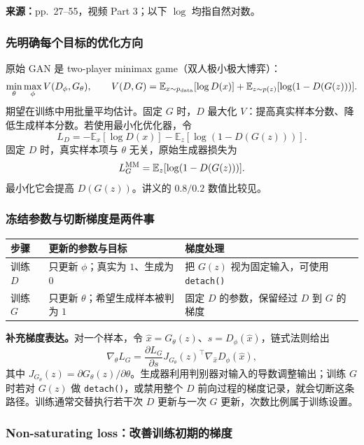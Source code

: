 \textbf{来源：}pp.~27--55，视频 Part 3；以下 $\log$ 均指自然对数。

\subsubsection{先明确每个目标的优化方向}

原始 GAN 是 two-player minimax game（双人极小极大博弈）：
\[
 \min_\theta\max_\phi V(D_\phi,G_\theta),\qquad
 V(D,G)=\mathbb E_{x\sim p_{\rm data}}[\log D(x)]
       +\mathbb E_{z\sim p(z)}[\log(1-D(G(z)))].
\]
期望在训练中用批量平均估计。固定 $G$ 时，$D$ 最大化 $V$：提高真实样本分数、降低生成样本分数。若使用最小化优化器，令
\[
 L_D=-\mathbb E_x[\log D(x)]-\mathbb E_z[\log(1-D(G(z)))].
\]
固定 $D$ 时，真实样本项与 $\theta$ 无关，原始生成器损失为
\[
 L_G^{\rm MM}=\mathbb E_z[\log(1-D(G(z)))].
\]
最小化它会提高 $D(G(z))$。讲义的 $0.8/0.2$ 数值比较见。

\subsubsection{冻结参数与切断梯度是两件事}

\begin{center}
\small
\begin{tabularx}{\textwidth}{@{}lXX@{}}
\toprule
步骤 & 更新的参数与目标 & 梯度处理 \\
\midrule
训练 $D$ & 只更新 $\phi$；真实为 $1$、生成为 $0$ & 把 $G(z)$ 视为固定输入，可使用 \texttt{detach()} \\
训练 $G$ & 只更新 $\theta$；希望生成样本被判为 $1$ & 固定 $D$ 的参数，保留经过 $D$ 到 $G$ 的梯度 \\
\bottomrule
\end{tabularx}
\end{center}

\textbf{补充梯度表达。}对一个样本，令 $\hat x=G_\theta(z)$、$s=D_\phi(\hat x)$，链式法则给出
\[
 \nabla_\theta L_G
 =\frac{\partial L_G}{\partial s}
   J_{G_\theta}(z)^\top\nabla_{\hat x}D_\phi(\hat x),
\]
其中 $J_{G_\theta}(z)=\partial G_\theta(z)/\partial\theta$。生成器利用判别器对输入的导数调整输出；训练 $G$ 时若对 $G(z)$ 做 \texttt{detach()}，或禁用整个 $D$ 前向过程的梯度记录，就会切断这条路径。训练通常交替执行若干次 $D$ 更新与一次 $G$ 更新，次数比例属于训练设置。

\subsubsection{Non-saturating loss：改善训练初期的梯度}

